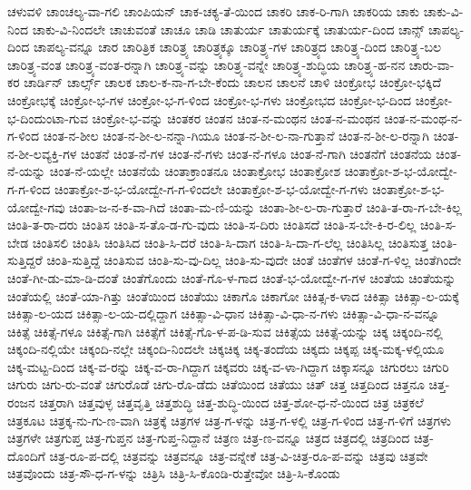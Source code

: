 {ಚಳುವಳಿ
ಚಾಂಚಲ್ಯ-ವಾ-ಗಲಿ
ಚಾಂಪಿಯನ್
ಚಾಕ-ಚಕ್ಯ-ತೆ-ಯಿಂದ
ಚಾಕರಿ
ಚಾಕ-ರಿ-ಗಾಗಿ
ಚಾಕರಿಯ
ಚಾಕು
ಚಾಕು-ವಿ-ನಿಂದ
ಚಾಕು-ವಿ-ನಿಂದಲೇ
ಚಾಚುವಂತೆ
ಚಾಚೂ
ಚಾಡಿ
ಚಾತುರ್ಯ
ಚಾತುರ್ಯಕ್ಕೆ
ಚಾತುರ್ಯ-ದಿಂದ
ಚಾನ್ಸ್
ಚಾಪಲ್ಯ-ದಿಂದ
ಚಾಪಲ್ಯ-ವನ್ನೂ
ಚಾರ
ಚಾರಿತ್ರಿಕ
ಚಾರಿತ್ರ್ಯ
ಚಾರಿತ್ರ್ಯಕ್ಕೂ
ಚಾರಿತ್ರ್ಯ-ಗಳ
ಚಾರಿತ್ರ್ಯದ
ಚಾರಿತ್ರ್ಯ-ದಿಂದ
ಚಾರಿತ್ರ್ಯ-ಬಲ
ಚಾರಿತ್ರ್ಯ-ವಂತ
ಚಾರಿತ್ರ್ಯ-ವಂತ-ರನ್ನಾಗಿ
ಚಾರಿತ್ರ್ಯ-ವನ್ನು
ಚಾರಿತ್ರ್ಯ-ವನ್ನೇ
ಚಾರಿತ್ರ್ಯ-ಶುದ್ಧಿಯ
ಚಾರಿತ್ರ್ಯ-ಹ-ನನ
ಚಾರು-ವಾ-ಕರ
ಚಾರ್ಡಿನ್
ಚಾರ್ಲ್ಸ್
ಚಾಲಕ
ಚಾಲ-ಕ-ನಾ-ಗ-ಬೇ-ಕೆಂದು
ಚಾಲನ
ಚಾಲನೆ
ಚಾಳಿ
ಚಿಂಕ್ರೋಭ
ಚಿಂಕ್ರೋ-ಭಕ್ಕಿದೆ
ಚಿಂಕ್ರೋಭಕ್ಕೆ
ಚಿಂಕ್ರೋ-ಭ-ಗಳ
ಚಿಂಕ್ರೋ-ಭ-ಗ-ಳಿಂದ
ಚಿಂಕ್ರೋ-ಭ-ಗಳು
ಚಿಂಕ್ರೋಭದ
ಚಿಂಕ್ರೋ-ಭ-ದಿಂದ
ಚಿಂಕ್ರೋ-ಭ-ದಿಂದುಂಟಾ-ಗುವ
ಚಿಂಕ್ರೋ-ಭ-ವನ್ನು
ಚಿಂತಕರ
ಚಿಂತನ
ಚಿಂತ-ನ-ಮಂಥನ
ಚಿಂತ-ನ-ಮಂಥನ
ಚಿಂತ-ನ-ಮಂಥ-ನ-ಗ-ಳಿಂದ
ಚಿಂತ-ನ-ಶೀಲ
ಚಿಂತ-ನ-ಶೀ-ಲ-ನನ್ನಾ-ಗಿಯೂ
ಚಿಂತ-ನ-ಶೀ-ಲ-ನಾ-ಗುತ್ತಾನೆ
ಚಿಂತ-ನ-ಶೀ-ಲ-ರನ್ನಾಗಿ
ಚಿಂತ-ನ-ಶೀ-ಲವ್ಯಕ್ತಿ-ಗಳ
ಚಿಂತನೆ
ಚಿಂತ-ನೆ-ಗಳ
ಚಿಂತ-ನೆ-ಗಳು
ಚಿಂತ-ನೆ-ಗಳೂ
ಚಿಂತ-ನೆ-ಗಾಗಿ
ಚಿಂತನೆಗೆ
ಚಿಂತನೆಯ
ಚಿಂತ-ನೆ-ಯನ್ನು
ಚಿಂತ-ನೆ-ಯಲ್ಲೇ
ಚಿಂತನೆಯೆ
ಚಿಂತಾಕ್ರಾಂತನೂ
ಚಿಂತಾಕ್ರೋಭ
ಚಿಂತಾಕ್ರೋಶ
ಚಿಂತಾಕ್ರೋ-ಶ-ಭ-ಯೋದ್ವೇ-ಗ-ಗ-ಳಿಂದ
ಚಿಂತಾಕ್ರೋ-ಶ-ಭ-ಯೋದ್ವೇ-ಗ-ಗ-ಳಿಂದಲೇ
ಚಿಂತಾಕ್ರೋ-ಶ-ಭ-ಯೋದ್ವೇ-ಗ-ಗಳು
ಚಿಂತಾಕ್ರೋ-ಶ-ಭ-ಯೋದ್ವೇ-ಗವು
ಚಿಂತಾ-ಜ-ನ-ಕ-ವಾ-ಗಿದೆ
ಚಿಂತಾ-ಮ-ಣಿ-ಯನ್ನು
ಚಿಂತಾ-ಶೀ-ಲ-ರಾ-ಗುತ್ತಾರೆ
ಚಿಂತಿ-ತ-ರಾ-ಗ-ಬೇ-ಕಿಲ್ಲ
ಚಿಂತಿ-ತ-ರಾ-ದರು
ಚಿಂತಿಸ
ಚಿಂತಿ-ಸ-ತೊ-ಡ-ಗು-ವುದು
ಚಿಂತಿ-ಸ-ದಿರು
ಚಿಂತಿಸದೆ
ಚಿಂತಿ-ಸ-ಬೇ-ಕಿ-ರ-ಲಿಲ್ಲ
ಚಿಂತಿ-ಸ-ಬೇಡ
ಚಿಂತಿಸಲಿ
ಚಿಂತಿಸಿ
ಚಿಂತಿಸಿದ
ಚಿಂತಿ-ಸಿ-ದರೆ
ಚಿಂತಿ-ಸಿ-ದಾಗ
ಚಿಂತಿ-ಸಿ-ದಾ-ಗ-ಲೆಲ್ಲ
ಚಿಂತಿಸಿಲ್ಲ
ಚಿಂತಿಸುತ್ತ
ಚಿಂತಿ-ಸುತ್ತಿದ್ದರೆ
ಚಿಂತಿ-ಸುತ್ತಿದ್ದೆ
ಚಿಂತಿಸುವ
ಚಿಂತಿ-ಸು-ವು-ದಿಲ್ಲ
ಚಿಂತಿ-ಸು-ವುದೇ
ಚಿಂತೆ
ಚಿಂತೆಗಳ
ಚಿಂತೆ-ಗ-ಳಿಲ್ಲ
ಚಿಂತೆಗಿಂದೇ
ಚಿಂತೆ-ಗೀ-ಡು-ಮಾ-ಡಿ-ದಂತೆ
ಚಿಂತೆಗೊಂದು
ಚಿಂತೆ-ಗೊ-ಳ-ಗಾದ
ಚಿಂತೆ-ಭ-ಯೋದ್ವೇ-ಗ-ಗಳ
ಚಿಂತೆಯ
ಚಿಂತೆಯನ್ನು
ಚಿಂತೆಯಲ್ಲಿ
ಚಿಂತೆ-ಯಾ-ಗಿತ್ತು
ಚಿಂತೆಯಿಂದ
ಚಿಂತೆಯು
ಚಿಕಾಗೊ
ಚಿಕಾಗೋ
ಚಿಕಿತ್ಸ-ಕ-ಳಾದ
ಚಿಕಿತ್ಸಾ
ಚಿಕಿತ್ಸಾ-ಲ-ಯಕ್ಕೆ
ಚಿಕಿತ್ಸಾ-ಲ-ಯದ
ಚಿಕಿತ್ಸಾ-ಲ-ಯ-ದಲ್ಲಿದ್ದಾಗ
ಚಿಕಿತ್ಸಾ-ವಿ-ಧಾನ
ಚಿಕಿತ್ಸಾ-ವಿ-ಧಾ-ನ-ಗಳು
ಚಿಕಿತ್ಸಾ-ವಿ-ಧಾ-ನ-ವನ್ನೂ
ಚಿಕಿತ್ಸೆ
ಚಿಕಿತ್ಸೆ-ಗಳೂ
ಚಿಕಿತ್ಸೆ-ಗಾಗಿ
ಚಿಕಿತ್ಸೆಗೆ
ಚಿಕಿತ್ಸೆ-ಗೊ-ಳ-ಪ-ಡಿ-ಸುವ
ಚಿಕಿತ್ಸೆಯ
ಚಿಕಿತ್ಸೆ-ಯನ್ನು
ಚಿಕ್ಕ
ಚಿಕ್ಕಂದಿ-ನಲ್ಲಿ
ಚಿಕ್ಕಂದಿ-ನಲ್ಲಿಯೇ
ಚಿಕ್ಕಂದಿ-ನಲ್ಲೇ
ಚಿಕ್ಕಂದಿ-ನಿಂದಲೇ
ಚಿಕ್ಕಚಿಕ್ಕ
ಚಿಕ್ಕ-ತಂದೆಯ
ಚಿಕ್ಕದು
ಚಿಕ್ಕಪ್ಪ
ಚಿಕ್ಕ-ಮಕ್ಕ-ಳಲ್ಲಿಯೂ
ಚಿಕ್ಕ-ಮಟ್ಟ-ದಿಂದ
ಚಿಕ್ಕ-ವ-ರನ್ನು
ಚಿಕ್ಕ-ವ-ರಾ-ಗಿದ್ದಾಗ
ಚಿಕ್ಕವರು
ಚಿಕ್ಕ-ವ-ಳಾ-ಗಿದ್ದಾಗ
ಚಿಕ್ಕಾಸನ್ನೂ
ಚಿಗುರಲು
ಚಿಗುರಿ
ಚಿಗುರು
ಚಿಗು-ರು-ವಂತೆ
ಚಿಗುರೊಡೆ
ಚಿಗು-ರೊ-ಡೆದು
ಚಿತೆಯಿಂದ
ಚಿತೆಯು
ಚಿತ್
ಚಿತ್ತ
ಚಿತ್ತದಿಂದ
ಚಿತ್ತನೂ
ಚಿತ್ತ-ರಂಜನ
ಚಿತ್ತರಾಗಿ
ಚಿತ್ತವುಳ್ಳ
ಚಿತ್ತವೃತ್ತಿ
ಚಿತ್ತಶುದ್ಧಿ
ಚಿತ್ತ-ಶುದ್ಧಿ-ಯಿಂದ
ಚಿತ್ತ-ಶೋ-ಧ-ನೆ-ಯಿಂದ
ಚಿತ್ರ
ಚಿತ್ರಕಲೆ
ಚಿತ್ರಕೂಟ
ಚಿತ್ರಕ್ಕ-ನು-ಗು-ಣ-ವಾಗಿ
ಚಿತ್ರಕ್ಕೆ
ಚಿತ್ರಗಳ
ಚಿತ್ರ-ಗ-ಳನ್ನು
ಚಿತ್ರ-ಗ-ಳಲ್ಲಿ
ಚಿತ್ರ-ಗ-ಳಿಂದ
ಚಿತ್ರ-ಗ-ಳಿಗೆ
ಚಿತ್ರಗಳು
ಚಿತ್ರಗಳೇ
ಚಿತ್ರಗುಪ್ತ
ಚಿತ್ರ-ಗುಪ್ತನ
ಚಿತ್ರ-ಗುಪ್ತ-ನಿದ್ದಾನೆ
ಚಿತ್ರಣ
ಚಿತ್ರ-ಣ-ವನ್ನೂ
ಚಿತ್ರದ
ಚಿತ್ರದಲ್ಲಿ
ಚಿತ್ರದಿಂದ
ಚಿತ್ರ-ದೊಂದಿಗೆ
ಚಿತ್ರ-ರೂ-ಪ-ದಲ್ಲಿ
ಚಿತ್ರವನ್ನು
ಚಿತ್ರವನ್ನೂ
ಚಿತ್ರ-ವನ್ನೇಕೆ
ಚಿತ್ರ-ವಿ-ಚಿತ್ರ-ರೂ-ಪ-ವನ್ನು
ಚಿತ್ರವು
ಚಿತ್ರವೇ
ಚಿತ್ರವೊಂದು
ಚಿತ್ರ-ಸೌ-ಧ-ಗ-ಳನ್ನು
ಚಿತ್ರಿಸಿ
ಚಿತ್ರಿ-ಸಿ-ಕೊಂಡಿ-ರುತ್ತೇವೋ
ಚಿತ್ರಿ-ಸಿ-ಕೊಂಡು
}
